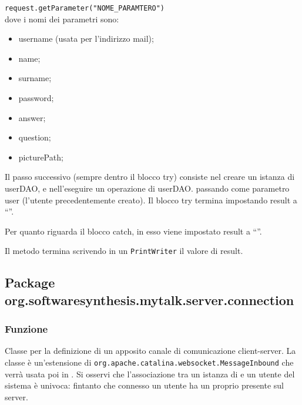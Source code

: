 \begin{description}
	\verb|request.getParameter("NOME_PARAMTERO")|\\
	
	dove i nomi dei parametri sono:
	\begin{itemize}
		\item username (usata per l'indirizzo mail);
		\item name;
		\item surname;
		\item password;
		\item answer;
		\item question;
		\item picturePath;
	\end{itemize}
	Il passo successivo (sempre dentro il blocco try) consiste nel creare un istanza di  userDAO, e nell'eseguire un operazione di userDAO. passando come parametro user (l'utente precedentemente creato). Il blocco try termina impostando result a ``''.
	
	Per quanto riguarda il blocco catch, in esso viene impostato result a ``''.
	
	Il metodo termina scrivendo in un \texttt{PrintWriter} il valore di result.
\end{description}


\subsection{Package org.softwaresynthesis.mytalk.server.connection}\label{sec:connection}


\subsubsection*{Funzione}
Classe per la definizione di un apposito canale di comunicazione client-server. La classe è un'estensione di \texttt{org.apache.catalina.websocket.MessageInbound} che verrà usata poi in . Si osservi che l'associazione tra un istanza di  e un utente del sistema è univoca: fintanto che connesso un utente ha un proprio  presente sul server.

